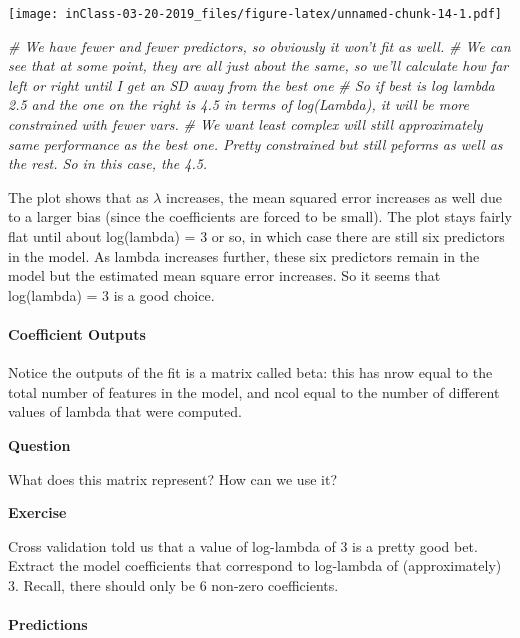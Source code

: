 \documentclass[]{article}
\newenvironment{Shaded}{\begin{snugshade}}{\end{snugshade}}
\newcommand{\CommentTok}[1]{\textcolor[rgb]{0.56,0.35,0.01}{\textit{{#1}}}}
\let\oldparagraph\paragraph
\renewcommand{\paragraph}[1]{\oldparagraph{#1}\mbox{}}
\begin{document}
\texttt{[image: inClass-03-20-2019\_files/figure-latex/unnamed-chunk-14-1.pdf]}

\begin{Shaded}
\begin{Highlighting}[]
\CommentTok{# We have fewer and fewer predictors, so obviously it won't fit as well. }
\CommentTok{# We can see that at some point, they are all just about the same, so we'll calculate how far left or right until I get an SD away from the best one }
\CommentTok{# So if best is log lambda 2.5 and the one on the right is 4.5 in terms of log(Lambda), it will be more constrained with fewer vars. }
\CommentTok{# We want least complex will still approximately same performance as the best one. Pretty constrained but still peforms as well as the rest. So in this case, the 4.5. }
\end{Highlighting}
\end{Shaded}

The plot shows that as \(\lambda\) increases, the mean squared error
increases as well due to a larger bias (since the coefficients are
forced to be small). The plot stays fairly flat until about log(lambda)
= 3 or so, in which case there are still six predictors in the model. As
lambda increases further, these six predictors remain in the model but
the estimated mean square error increases. So it seems that log(lambda)
= 3 is a good choice.

\paragraph{Coefficient Outputs}\label{coefficient-outputs}

Notice the outputs of the fit is a matrix called beta: this has nrow
equal to the total number of features in the model, and ncol equal to
the number of different values of lambda that were computed.

\textbf{Question}

What does this matrix represent? How can we use it?

\textbf{Exercise}

Cross validation told us that a value of log-lambda of 3 is a pretty
good bet. Extract the model coefficients that correspond to log-lambda
of (approximately) 3. Recall, there should only be 6 non-zero
coefficients.

\paragraph{Predictions}\label{predictions}
\end{document}
